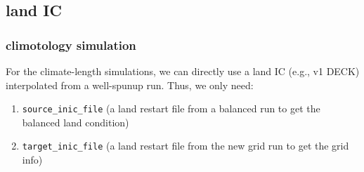 \documentclass[journal abbreviation, manuscript]{copernicus}
\begin{document}
\vspace{\baselineskip}



\subsection{land IC}

\subsubsection{climotology simulation}
For the climate-length simulations, we can directly use a land IC (e.g., v1 DECK) interpolated from a well-spunup run. Thus, we only need:
\begin{enumerate}
\item \verb|source_inic_file| (a land restart file from a balanced run to get the balanced land condition)
\item \verb|target_inic_file| (a land restart file from the new grid run to get the grid info)
\end{enumerate}
\vspace{\baselineskip}
\end{document}

